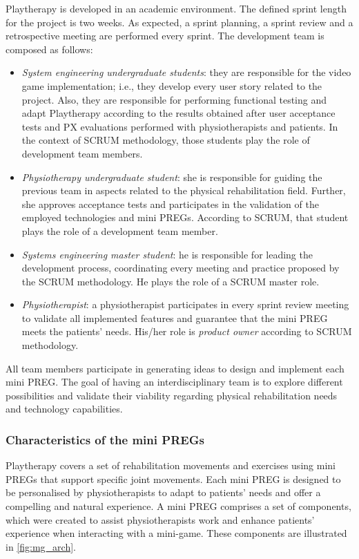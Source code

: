 Playtherapy is developed in an academic environment. The defined sprint length for the project is two weeks. As expected, a sprint planning, a sprint review and a retrospective meeting are performed every sprint. The development team is composed as follows:
\begin{itemize}
    \item \emph{System engineering undergraduate students}: they are responsible for the video game implementation; i.e., they develop every user story related to the project. Also, they are responsible for performing functional testing and adapt Playtherapy according to the results obtained after user acceptance tests and \ac{PX} evaluations performed with physiotherapists and patients. In the context of SCRUM methodology, those students play the role of development team members.
    \item \emph{Physiotherapy undergraduate student}: she is responsible for guiding the previous team in aspects related to the physical rehabilitation field. Further, she approves acceptance tests and participates in the validation of the employed technologies and mini \acp{PREG}. According to SCRUM, that student plays the role of a development team member.
    \item \emph{Systems engineering master student}: he is responsible for leading the development process, coordinating every meeting and practice proposed by the SCRUM methodology. He plays the role of a SCRUM master role.
    \item \emph{Physiotherapist}: a physiotherapist participates in every sprint review meeting to validate all implemented features and guarantee that the mini \ac{PREG} meets the patients' needs. His/her role is \textit{product owner} according to SCRUM methodology.
\end{itemize}

All team members participate in generating ideas to design and implement each mini \ac{PREG}. The goal of having an interdisciplinary team is to explore different possibilities and validate their viability regarding physical rehabilitation needs and technology capabilities.

\subsubsection{Characteristics of the mini \acp{PREG}}
Playtherapy covers a set of rehabilitation movements and exercises using mini \acp{PREG} that support specific joint movements. Each mini \ac{PREG} is designed to be personalised by physiotherapists to adapt to patients' needs and offer a compelling and natural experience. A mini \ac{PREG} comprises a set of components, which were created to assist physiotherapists work and enhance patients' experience when interacting with a mini-game. These components are illustrated in \autoref{fig:mg_arch}.

